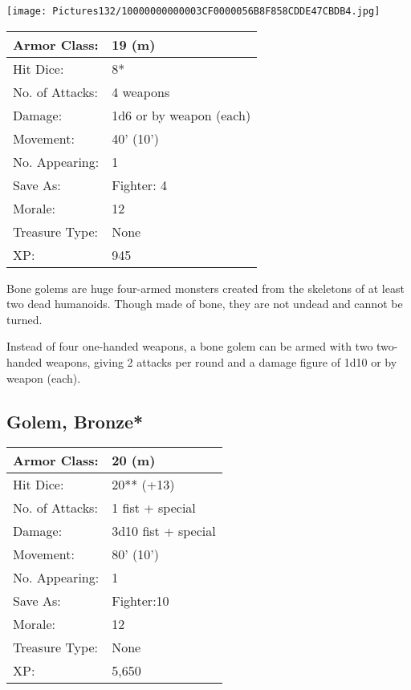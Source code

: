 \documentclass[a4paper,twoside,openany,10pt]{book}
\begin{document}
\begin{multicols}{2}
\begin{center}
	\texttt{[image: Pictures132/10000000000003CF0000056B8F858CDDE47CBDB4.jpg]}
\end{center}

\begin{center}
	\begin{tabularx}{0.48\textwidth}{@{}lX@{}}
Armor Class: & 19 (m) \\\hline
Hit Dice: & 8* \\\hline
No. of Attacks: & 4 weapons \\\hline
Damage: & 1d6 or by weapon (each) \\\hline
Movement: & 40' (10') \\\hline
No. Appearing: & 1 \\\hline
Save As: & Fighter: 4 \\\hline
Morale: & 12 \\\hline
Treasure Type: & None \\\hline
XP: & 945 \\\hline
\end{tabularx}\medskip
\end{center}

Bone golems are huge four-armed monsters created from the skeletons of at least two dead humanoids. Though made of bone, they are not undead and cannot be turned.

Instead of four one-handed weapons, a bone golem can be armed with two two-handed weapons, giving 2 attacks per round and a damage figure of 1d10 or by weapon (each).



\subsection*{Golem, Bronze*}\label{golem-bronze}

\begin{tabularx}{0.48\textwidth}{@{}lX@{}}
Armor Class: & 20 (m) \\\hline
Hit Dice: & 20** (+13) \\\hline
No. of Attacks: & 1 fist + special \\\hline
Damage: & 3d10 fist + special \\\hline
Movement: & 80' (10') \\\hline
No. Appearing: & 1 \\\hline
Save As: & Fighter:10 \\\hline
Morale: & 12 \\\hline
Treasure Type: & None \\\hline
XP: & 5,650 \\\hline
\end{tabularx}\medskip


\end{multicols}
\end{document}
